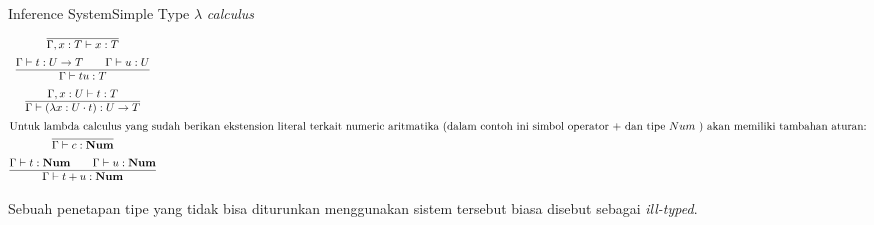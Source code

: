 \documentclass[aspectratio=1610,10pt,handout]{beamer}
\newcommand{\lc}{$\lambda$ {\it calculus}\ }
\begin{document}
\begin{frame}{Inference System}{Simple Type \lc }

	\begin{gather}
	\begin{gathered}[b]
	\hline
	\Gamma, x : T \vdash  x :T
	\end{gathered} \\
	\begin{gathered}[b]
	\Gamma \vdash t : U \to T \qquad
	\Gamma \vdash u : U \\
	\hline
	\Gamma \vdash tu : T
	\end{gathered} \label{stlc:Tapp}\\
	\begin{gathered}[b]
	\Gamma, x:U \vdash t : T\\
	\hline
	\Gamma \vdash (\lambda {x : U} \cdot t) : U \to T
	\end{gathered} \\
	\intertext{Untuk lambda calculus yang sudah berikan ekstension literal terkait numeric aritmatika (dalam contoh ini simbol operator $+$ dan tipe $Num$ ) akan memiliki tambahan aturan:}
	\begin{gathered}[b]
	\hline
	\Gamma \vdash c : \mathbf{Num}
	\end{gathered} \\
	\begin{gathered}[b]
	\Gamma \vdash t : \mathbf{Num} \qquad
	\Gamma \vdash u : \mathbf{Num} \\
	\hline
	\Gamma \vdash t+u : \mathbf{Num}
	\end{gathered}
	\end{gather}

Sebuah penetapan tipe yang tidak bisa diturunkan menggunakan sistem tersebut biasa disebut sebagai \emph{ill-typed}.


\end{frame}
\end{document}
